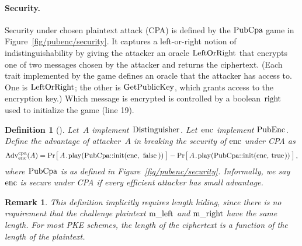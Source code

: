 \documentclass{article}
\newtheorem{definition}{Definition}
\newtheorem{remark}{Remark}
\newcommand{\Adv}[1]{\textrm{\textup{Adv}}^{\textup{#1}}}
\newcommand{\Prob}[1]{\Pr\hspace{-1pt}\big[\,#1\,\big]}
\newcommand{\code}[1]{\textrm{\textup{\lstinline{#1}}}}
\begin{document}
\paragraph{Security.}
%
Security under chosen plaintext attack (CPA) is defined by the $\code{PubCpa}$
game in Figure~\ref{fig/pubenc/security}.
%
It captures a left-or-right notion of indistinguishability by giving the
attacker an oracle \hyperref[sec/traits]{$\code{LeftOrRight}$} that encrypts
one of two messages chosen by the attacker and returns the ciphertext.
%
(Each trait implemented by the game defines an oracle that the attacker has
access to. One is $\code{LeftOrRight}$; the other is
\hyperref[sec/traits]{$\code{GetPublicKey}$}, which grants access to the
encryption key.)
%
Which message is encrypted is controlled by a boolean $\code{right}$ used to
initialize the game (line 19).

\begin{definition}[{\cite[Definition 15.1]{joy}}]
  Let~$A$ implement \hyperref[sec/traits]{$\code{Distinguisher}$}.
  Let~$\code{enc}$ implement \hyperref[fig/pubenc/syntax]{$\code{PubEnc}$}.
  Define the advantage of attacker~$A$ in breaking the security of
  $\code{enc}$ under CPA as
  \[
    \Adv{cpa}_{\code{enc}}(A) =
      \Prob{A\code{.play(PubCpa::init(enc, false))}} -
      \Prob{A\code{.play(PubCpa::init(enc, true))}} \,,
  \]
  where $\code{PubCpa}$ is as defined in Figure~\ref{fig/pubenc/security}.
  Informally, we say $\code{enc}$ is secure under CPA if every efficient
  attacker has small advantage.
\end{definition}

\begin{remark}
  This definition implicitly requires length hiding, since there is no
  requirement that the challenge plaintext $\code{m_left}$ and $\code{m_right}$
  have the same length. For most PKE schemes, the length of the ciphertext is a
  function of the length of the plaintext.
\end{remark}
\end{document}

